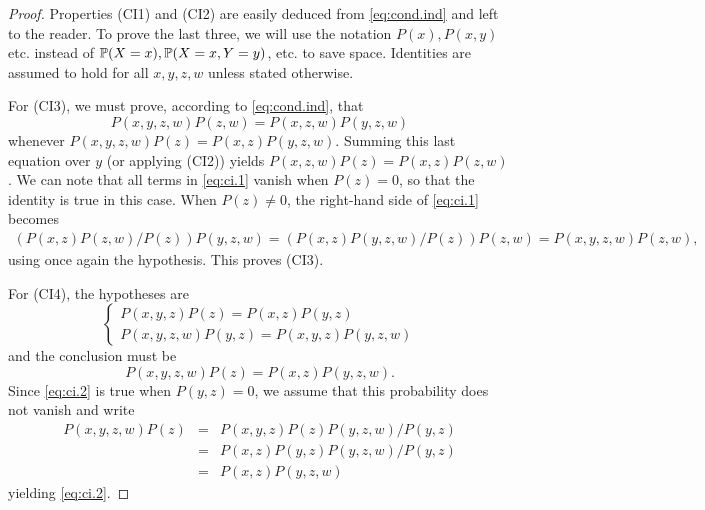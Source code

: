 \begin{proof}
%
%
%
%
%

Properties (CI1) and (CI2) are easily deduced from \cref{eq:cond.ind} and left to the reader. To prove
the last three, we will use the notation $P(x), P(x,y)$ etc. instead of
$\bm{\mathbb P}(X=x), \bm{\mathbb P}(X=x, Y=y)$, etc. to save space. Identities are assumed to
hold for all $x,y,z,w$ unless stated otherwise. 

For (CI3), we must prove,
according to  \cref{eq:cond.ind}, that
\begin{equation}
\label{eq:ci.1}
P(x,y,z,w) P(z,w) = P(x,z,w) P(y,z,w)
\end{equation}
whenever $P(x,y,z,w) P(z) = P(x,z) P(y,z,w)$. Summing this last
equation over $y$ (or applying (CI2)) yields $P(x,z,w) P(z) = P(x,z)
P(z,w)$. We can note that all terms in \cref{eq:ci.1} vanish when
$P(z) = 0$, so that the identity is true in this case. When $P(z)\neq
0$, the right-hand side of
\cref{eq:ci.1} becomes
\begin{multline*}
(P(x,z) P(z,w)/P(z))P(y,z,w) = (P(x,z)P(y,z,w)/P(z))P(z,w)
=
P(x,y,z,w)P(z,w),
\end{multline*}
using once again the hypothesis. This proves (CI3).

\medskip

For (CI4), the hypotheses are
\[
\begin{cases}
P(x,y,z)P(z) = P(x, z)P(y,z)\\
P(x,y,z,w)P(y,z) = P(x,y,z)P(y,z,w)
\end{cases}
\]
and the conclusion must be
\begin{equation}
  \label{eq:ci.2}
P(x,y,z,w) P(z) = P(x,z)P(y,z,w).  
\end{equation}
Since \cref{eq:ci.2} is true when $P(y,z) = 0$, we assume that this
probability does not vanish and write
\begin{eqnarray*}
P(x,y,z,w)P(z) &=& P(x,y,z)P(z) P(y,z,w)/P(y,z) \\
&=& P(x,z) P(y,z) P(y,z,w)/P(y,z)\\
&=& P(x,z)P(y,z,w)
\end{eqnarray*}
yielding \cref{eq:ci.2}.
  

\end{proof}
